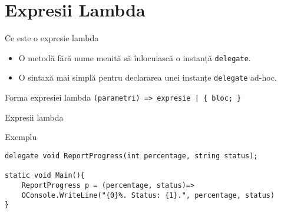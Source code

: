 \documentclass[presentation]{beamer}
\begin{document}
\section{Expresii Lambda}
\label{sec:org9a8555f}
\begin{frame}[label={sec:org5930a29},fragile]{Ce este o expresie lambda}
 \begin{itemize}
\item O metodă fără nume menită să înlocuiască o instanță \texttt{delegate}.
\item O sintaxă mai simplă pentru declararea unei instanțe \texttt{delegate} ad-hoc.
\vskip 0.3in
\end{itemize}
\begin{block}{Forma expresiei lambda}
\vskip 0.1in
\texttt{(parametri) => expresie | \{ bloc; \}}
\end{block}
\end{frame}
\begin{frame}[label={sec:orgc0f123a},fragile]{Expresii lambda}
 \begin{block}{Exemplu}
\begin{verbatim}
delegate void ReportProgress(int percentage, string status);

static void Main(){
    ReportProgress p = (percentage, status)=>
	OConsole.WriteLine("{0}%. Status: {1}.", percentage, status)
}
\end{verbatim}
\end{block}
\end{frame}
\end{document}
